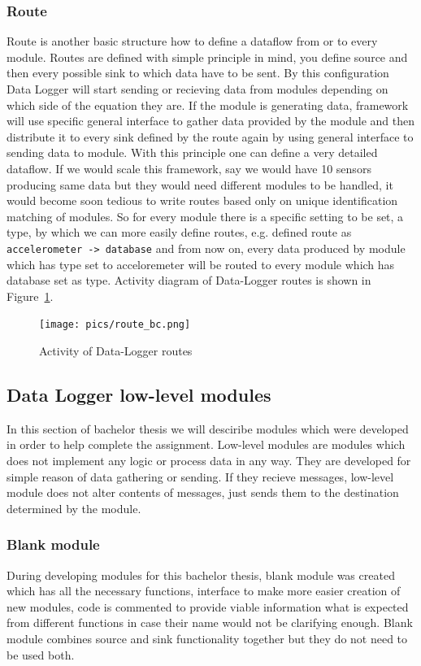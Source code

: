 \subsubsection{Route} %
\label{ssub:route}
Route is another basic structure how to define a dataflow from or to every module. Routes are defined with simple principle in mind, you define source and then every possible sink to which data have to be sent. By this configuration Data Logger will start sending or recieving data from modules depending on which side of the equation they are. If the module is generating data, framework will use specific general interface to gather data provided by the module and then distribute it to every sink defined by the route again by using general interface to sending data to module. With this principle one can define a very detailed dataflow. If we would scale this framework, say we would have 10 sensors producing same data but they would need different modules to be handled, it would become soon tedious to write routes based only on unique identification matching of modules. So for every module there is a specific setting to be set, a type, by which we can more easily define routes, e.g. defined route as \verb|accelerometer -> database| and from now on, every data produced by module which has type set to acceloremeter will be routed to every module which has database set as type. Activity diagram of Data-Logger routes is shown in Figure~\ref{fig:act}. 
\begin{figure}[H]
\begin{center}
\captionsetup{font=small}
\texttt{[image: pics/route\_bc.png]}
\caption{Activity of Data-Logger routes}
\label{fig:act}
\end{center}
\end{figure}
\label{sub:data_logger_framework}
\subsection{Data Logger low-level modules}

In this section of bachelor thesis we will desciribe modules which were developed in order to help complete the assignment. Low-level modules are modules which does not implement any logic or process data in any way. They are developed for simple reason of data gathering or sending. If they recieve messages, low-level module does not alter contents of messages, just sends them to the destination determined by the module.
\subsubsection{Blank module} %
\label{ssub:blank_module}
During developing modules for this bachelor thesis, blank module was created which has all the necessary functions, interface to make more easier creation of new modules, code is commented to provide viable information what is expected from different functions in case their name would not be clarifying enough. Blank module combines source and sink functionality together but they do not need to be used both.
